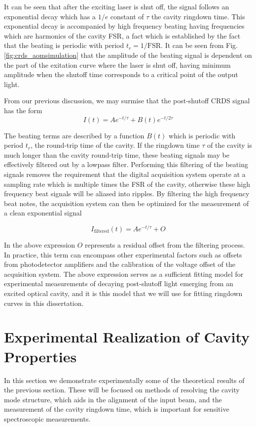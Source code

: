 It can be seen that after the exciting laser is shut off, the signal follows an exponential decay which has a $1/e$ constant of $\tau$ the cavity ringdown time. This exponential decay is accompanied by high frequency beating having frequencies which are harmonics of the cavity FSR, a fact which is established by the fact that the beating is periodic with period $t_r = 1/\mathrm{FSR}$. It can be seen from Fig. \ref{fig:crds_aomsimulation} that the amplitude of the beating signal is dependent on the part of the exitation curve where the laser is shut off, having minimum amplitude when the shutoff time corresponds to a critical point of the output light.

From our previous discussion, we may surmise that the post-shutoff CRDS signal has the form
\begin{equation}
	I(t) = A e^{-t/\tau} + B(t) e^{-t/2\tau}
\end{equation}

The beating terms are described by a function $B(t)$ which is periodic with period $t_r$, the round-trip time of the cavity. If the ringdown time $\tau$ of the cavity is much longer than the cavity round-trip time, these beating signals may be effectively filtered out by a lowpass filter. Performing this filtering of the beating signals removes the requirement that the digital acquisition system operate at a sampling rate which is multiple times the FSR of the cavity, otherwise these high frequency beat signals will be aliased into ripples. By filtering the high frequency beat notes, the acquisition system can then be optimized for the measurement of a clean exponential signal

\begin{equation}
	I_\mathrm{filtered}(t) = A e^{-t/\tau} + O
\end{equation}

In the above expression $O$ represents a residual offset from the filtering process. In practice, this term can encompass other experimental factors such as offsets from photodetector amplifiers and the calibration of the voltage offset of the acquisition system. The above expression serves as a sufficient fitting model for experimental measurements of decaying post-shutoff light emerging from an excited optical cavity, and it is this model that we will use for fitting ringdown curves in this dissertation.

\section{Experimental Realization of Cavity Properties}
In this section we demonstrate experimentally some of the theoretical results of the previous section. These will be focused on methods of resolving the cavity mode structure, which aids in the alignment of the input beam, and the measurement of the cavity ringdown time, which is important for sensitive spectroscopic measurements.

